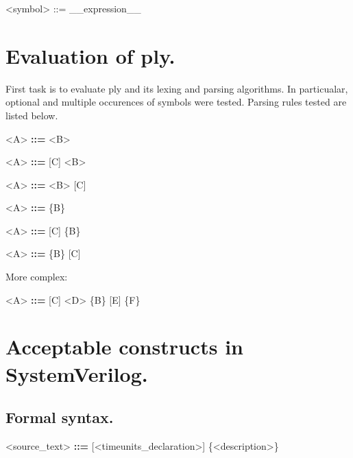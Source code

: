 \documentclass{article}
\begin{document}
\begin{grammar}
    <symbol> ::= __expression__
\end{grammar}

\section{Evaluation of ply.}
{ First task is to evaluate ply and its lexing and parsing algorithms. In particualar, optional
and multiple occurences of symbols were tested. Parsing rules tested are listed below.}

\begin{grammar}
    <A> \textbf{::=} <B>
\end{grammar}

\begin{grammar}
    <A> \textbf{::=} [C] <B>
\end{grammar}

\begin{grammar}
    <A> \textbf{::=} <B> [C]
\end{grammar}

\begin{grammar}
    <A> \textbf{::=} \{B\}
\end{grammar}

\begin{grammar}
    <A> \textbf{::=} [C] \{B\}
\end{grammar}

\begin{grammar}
    <A> \textbf{::=} \{B\} [C]
\end{grammar}

More complex:

\begin{grammar}
    <A> \textbf{::=} [C] <D> \{B\} [E] \{F\}
\end{grammar}


\section{Acceptable constructs in SystemVerilog.}

\subsection{Formal syntax.}

\begin{grammar}
    <source_text> \textbf{::=} [<timeunits_declaration>] \{<description>\}
\end{grammar}
\end{document}
